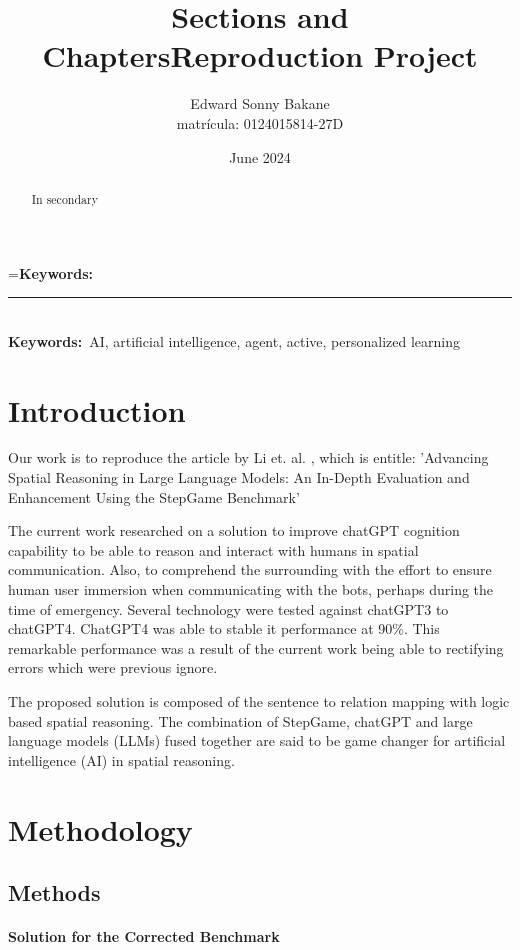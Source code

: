 \documentclass{article}
\title{Sections and Chapters}
\title{Reproduction Project\\}
\author{Edward Sonny Bakane \\
        matrícula: 0124015814-27D
        }
\date{June 2024}
\begin{document}
\newbox\keywbox
\setbox\keywbox=\hbox{\bfseries Keywords:}%

\newcommand\keywords{%
\noindent\rule{\wd\keywbox}{0.25pt}\\\textbf{Keywords:}\ }
\maketitle

\begin{abstract}
In secondary
\end{abstract}

\keywords AI, artificial intelligence, agent, active, personalized learning

\section{Introduction}

Our work is to reproduce the article by Li et. al. \cite{li2024}, which is entitle: 'Advancing Spatial Reasoning in Large Language Models: An In-Depth Evaluation and Enhancement Using the StepGame Benchmark'

The current work researched on a solution to improve chatGPT cognition capability to be able to reason and interact with humans in spatial communication. Also, to comprehend the surrounding with the effort to ensure human user immersion when communicating with the bots, perhaps during the time of emergency. Several technology were tested against chatGPT3 to chatGPT4. ChatGPT4 was able to stable it performance at 90\%. This remarkable performance was a result of the current work being able to rectifying errors which were previous ignore. 

The proposed solution is composed of the sentence to relation mapping with logic based spatial reasoning. The combination of StepGame, chatGPT and large language models (LLMs) fused together are said to be game changer for artificial intelligence (AI) in spatial reasoning.  


\section{Methodology}

\subsection{Methods}

\paragraph{Solution for the Corrected Benchmark}
\end{document}
